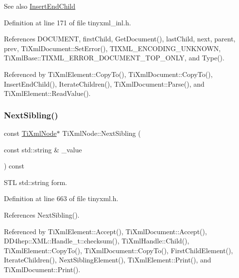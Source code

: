 \begin{DoxySeeAlso}{See also}
\hyperlink{class_ti_xml_node_af287a913ce46d8dbf7ef24fec69bbaf0}{Insert\+End\+Child} 
\end{DoxySeeAlso}


Definition at line 171 of file tinyxml\+\_\+inl.\+h.



References D\+O\+C\+U\+M\+E\+NT, first\+Child, Get\+Document(), last\+Child, next, parent, prev, Ti\+Xml\+Document\+::\+Set\+Error(), T\+I\+X\+M\+L\+\_\+\+E\+N\+C\+O\+D\+I\+N\+G\+\_\+\+U\+N\+K\+N\+O\+WN, Ti\+Xml\+Base\+::\+T\+I\+X\+M\+L\+\_\+\+E\+R\+R\+O\+R\+\_\+\+D\+O\+C\+U\+M\+E\+N\+T\+\_\+\+T\+O\+P\+\_\+\+O\+N\+LY, and Type().



Referenced by Ti\+Xml\+Element\+::\+Copy\+To(), Ti\+Xml\+Document\+::\+Copy\+To(), Insert\+End\+Child(), Iterate\+Children(), Ti\+Xml\+Document\+::\+Parse(), and Ti\+Xml\+Element\+::\+Read\+Value().

\hypertarget{class_ti_xml_node_a5f0bf3809d4a35456d28cc9522c26245}{}\label{class_ti_xml_node_a5f0bf3809d4a35456d28cc9522c26245} 
\subsubsection{\texorpdfstring{Next\+Sibling()}{NextSibling()}\hspace{0.1cm}{\footnotesize\ttfamily [1/6]}}
{\footnotesize\ttfamily const \hyperlink{class_ti_xml_node}{Ti\+Xml\+Node}$\ast$ Ti\+Xml\+Node\+::\+Next\+Sibling (\begin{DoxyParamCaption}\item[{const std\+::string \&}]{\+\_\+value }\end{DoxyParamCaption}) const\hspace{0.3cm}{\ttfamily [inline]}}



S\+TL std\+::string form. 



Definition at line 663 of file tinyxml.\+h.



References Next\+Sibling().



Referenced by Ti\+Xml\+Element\+::\+Accept(), Ti\+Xml\+Document\+::\+Accept(), D\+D4hep\+::\+X\+M\+L\+::\+Handle\+\_\+t\+::checksum(), Ti\+Xml\+Handle\+::\+Child(), Ti\+Xml\+Element\+::\+Copy\+To(), Ti\+Xml\+Document\+::\+Copy\+To(), First\+Child\+Element(), Iterate\+Children(), Next\+Sibling\+Element(), Ti\+Xml\+Element\+::\+Print(), and Ti\+Xml\+Document\+::\+Print().

